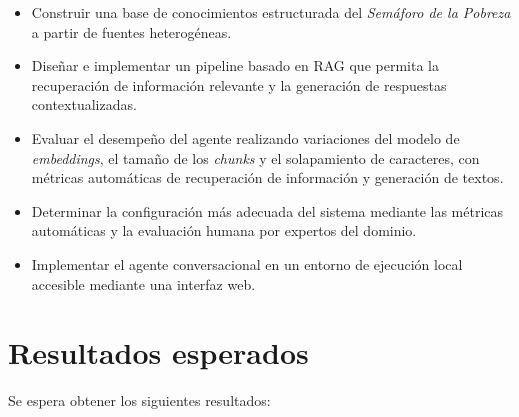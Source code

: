 \documentclass{article}
\begin{document}
\begin{itemize}

\item Construir una base de conocimientos estructurada del \textit{Semáforo de la Pobreza} a partir de fuentes heterogéneas.

\item Diseñar e implementar un pipeline basado en RAG que permita la recuperación de información relevante y la generación de respuestas contextualizadas.

\item Evaluar el desempeño del agente realizando variaciones del modelo de \textit{embeddings}, el tamaño de los \textit{chunks} y el solapamiento de caracteres, con métricas automáticas de recuperación de información y generación de textos.

\item Determinar la configuración más adecuada del sistema mediante las métricas automáticas y la evaluación humana por expertos del dominio.

\item Implementar el agente conversacional en un entorno de ejecución local accesible mediante una interfaz web.

\end{itemize}

\section{Resultados esperados}

Se espera obtener los siguientes resultados:
\end{document}
